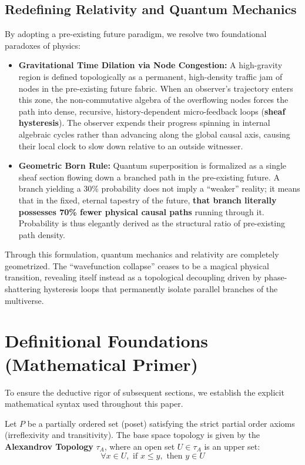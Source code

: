 \documentclass[12pt,letterpaper]{article}
\begin{document}
\subsection{Redefining Relativity and Quantum Mechanics}
By adopting a pre-existing future paradigm, we resolve two foundational paradoxes of physics:
\begin{itemize}
    \item \textbf{Gravitational Time Dilation via Node Congestion:} A high-gravity region is defined topologically as a permanent, high-density traffic jam of nodes in the pre-existing future fabric. When an observer's trajectory enters this zone, the non-commutative algebra of the overflowing nodes forces the path into dense, recursive, history-dependent micro-feedback loops (\textbf{sheaf hysteresis}). The observer expends their progress spinning in internal algebraic cycles rather than advancing along the global causal axis, causing their local clock to slow down relative to an outside witnesser.
    \item \textbf{Geometric Born Rule:} Quantum superposition is formalized as a single sheaf section flowing down a branched path in the pre-existing future. A branch yielding a 30\% probability does not imply a ``weaker'' reality; it means that in the fixed, eternal tapestry of the future, \textbf{that branch literally possesses 70\% fewer physical causal paths} running through it. Probability is thus elegantly derived as the structural ratio of pre-existing path density.
\end{itemize}

Through this formulation, quantum mechanics and relativity are completely geometrized. The ``wavefunction collapse'' ceases to be a magical physical transition, revealing itself instead as a topological decoupling driven by phase-shattering hysteresis loops that permanently isolate parallel branches of the multiverse.

\section{Definitional Foundations (Mathematical Primer)}

To ensure the deductive rigor of subsequent sections, we establish the explicit mathematical syntax used throughout this paper.

Let $P$ be a partially ordered set (poset) satisfying the strict partial order axioms (irreflexivity and transitivity). The base space topology is given by the \textbf{Alexandrov Topology} $\tau_A$, where an open set $U \in \tau_A$ is an upper set:
$$\forall x \in U, \text{ if } x \le y, \text{ then } y \in U$$
\end{document}
